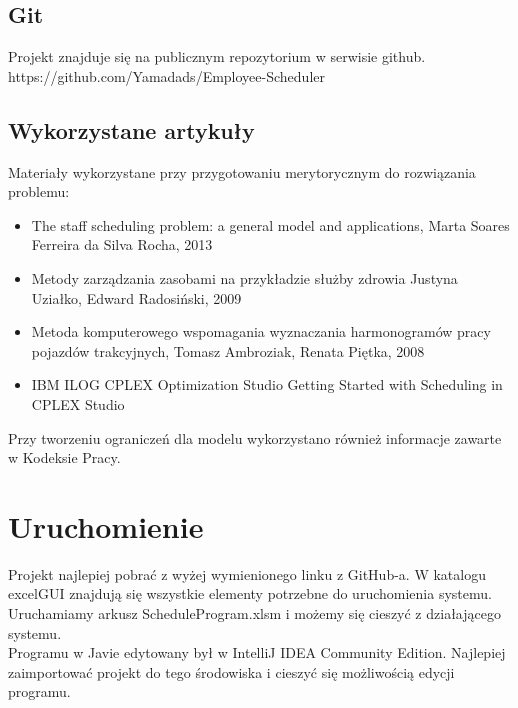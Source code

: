 \documentclass{article}
\begin{document}
\subsection{Git}
Projekt znajduje się na publicznym repozytorium w serwisie github.
\\https://github.com/Yamadads/Employee-Scheduler

\subsection{Wykorzystane artykuły}
Materiały wykorzystane przy przygotowaniu merytorycznym do rozwiązania problemu:
\begin{itemize}
    \item {The staff scheduling problem: a general
model and applications,
Marta Soares Ferreira da Silva Rocha, 2013}
    \item{Metody zarządzania zasobami na przykładzie służby zdrowia
Justyna Uziałko,
Edward Radosiński, 2009}
    \item{Metoda komputerowego wspomagania wyznaczania harmonogramów pracy pojazdów trakcyjnych,
Tomasz Ambroziak, Renata Piętka, 2008}
    \item{IBM ILOG CPLEX Optimization Studio
Getting Started with Scheduling in CPLEX Studio}
\end{itemize}


Przy tworzeniu ograniczeń dla modelu wykorzystano również informacje zawarte w Kodeksie Pracy.

\section{Uruchomienie}
Projekt najlepiej pobrać z wyżej wymienionego linku z GitHub-a.
W katalogu excelGUI znajdują się wszystkie elementy potrzebne do uruchomienia systemu. Uruchamiamy arkusz ScheduleProgram.xlsm i możemy się cieszyć z działającego systemu. \\
Programu w Javie edytowany był w IntelliJ IDEA Community Edition. Najlepiej zaimportować projekt do tego środowiska i cieszyć się możliwością edycji programu. 
\end{document}
